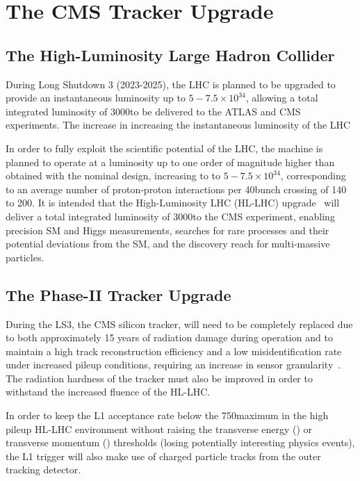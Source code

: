 \chapter{The CMS Tracker Upgrade}\label{chapter:tk-upgrade}
 
\section{The High-Luminosity Large Hadron Collider} 
During Long Shutdown 3 (2023-2025), the LHC is planned to be upgraded to provide an instantaneous luminosity up to $5-7.5 \times {10}^{34}$\percms, allowing a total integrated luminosity of 3000\fbinv to be delivered to the ATLAS and CMS experiments.
The increase in increasing the instantaneous luminosity of the LHC

In order to fully exploit the scientific potential of the LHC, the machine is planned to operate at a luminosity up to one order of magnitude higher than obtained with the nominal design, increasing to to $5-7.5 \times {10}^{34}$\percms, corresponding to an average number of proton-proton interactions per 40\MHz bunch crossing of 140 to 200.
It is intended that the High-Luminosity LHC (HL-LHC) upgrade~\cite{hl-lhc-prelim-design-report} will deliver a total integrated luminosity of 3000\fbinv to the CMS experiment, enabling precision SM and Higgs measurements, searches for rare processes and their potential deviations from the SM, and the discovery reach for multi-\TeV massive particles. 

\section{The Phase-II Tracker Upgrade}

During the LS3, the CMS silicon tracker, will need to be completely replaced due to both approximately 15 years of radiation damage during operation and to maintain a high track reconstruction efficiency and a low misidentification rate under increased pileup conditions, requiring an increase in sensor granularity~\cite{P2TrackerTDR}.
The radiation hardness of the tracker must also be improved in order to withstand the increased fluence of the HL-LHC.

In order to keep the L1 acceptance rate below the 750\kHz maximum in the high pileup HL-LHC environment without raising the transverse energy (\ET) or transverse momentum (\pT) thresholds (losing potentially interesting physics events), the L1 trigger will also make use of charged particle tracks from the outer tracking detector.
 
